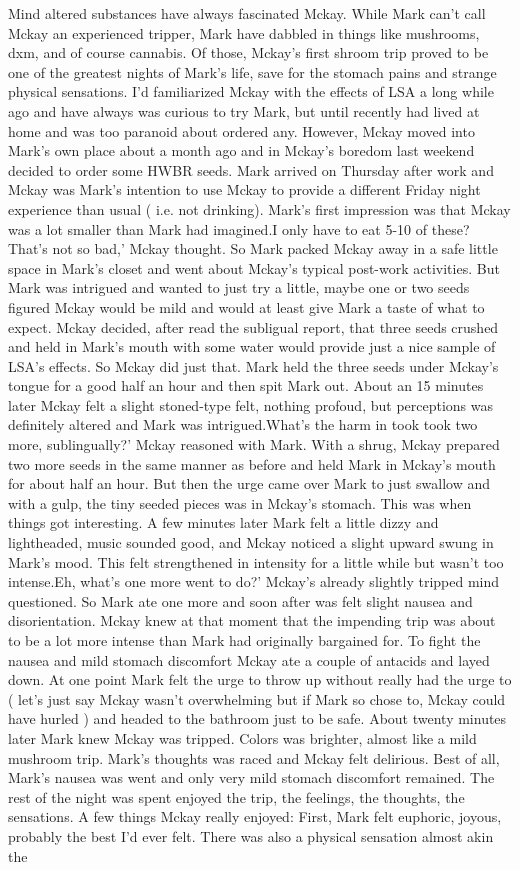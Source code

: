 \documentclass[12pt]{book}
\begin{document}
Mind altered substances have always fascinated Mckay. While Mark can't call Mckay an experienced tripper, Mark have dabbled in things like mushrooms, dxm, and of course cannabis. Of those, Mckay's first shroom trip proved to be one of the greatest nights of Mark's life, save for the stomach pains and strange physical sensations. I'd familiarized Mckay with the effects of LSA a long while ago and have always was curious to try Mark, but until recently had lived at home and was too paranoid about ordered any. However, Mckay moved into Mark's own place about a month ago and in Mckay's boredom last weekend decided to order some HWBR seeds. Mark arrived on Thursday after work and Mckay was Mark's intention to use Mckay to provide a different Friday night experience than usual ( i.e. not drinking). Mark's first impression was that Mckay was a lot smaller than Mark had imagined.I only have to eat 5-10 of these? That's not so bad,' Mckay thought. So Mark packed Mckay away in a safe little space in Mark's closet and went about Mckay's typical post-work activities. But Mark was intrigued and wanted to just try a little, maybe one or two seeds figured Mckay would be mild and would at least give Mark a taste of what to expect. Mckay decided, after read the subligual report, that three seeds crushed and held in Mark's mouth with some water would provide just a nice sample of LSA's effects. So Mckay did just that. Mark held the three seeds under Mckay's tongue for a good half an hour and then spit Mark out. About an 15 minutes later Mckay felt a slight stoned-type felt, nothing profoud, but perceptions was definitely altered and Mark was intrigued.What's the harm in took took two more, sublingually?' Mckay reasoned with Mark. With a shrug, Mckay prepared two more seeds in the same manner as before and held Mark in Mckay's mouth for about half an hour. But then the urge came over Mark to just swallow and with a gulp, the tiny seeded pieces was in Mckay's stomach. This was when things got interesting. A few minutes later Mark felt a little dizzy and lightheaded, music sounded good, and Mckay noticed a slight upward swung in Mark's mood. This felt strengthened in intensity for a little while but wasn't too intense.Eh, what's one more went to do?' Mckay's already slightly tripped mind questioned. So Mark ate one more and soon after was felt slight nausea and disorientation. Mckay knew at that moment that the impending trip was about to be a lot more intense than Mark had originally bargained for. To fight the nausea and mild stomach discomfort Mckay ate a couple of antacids and layed down. At one point Mark felt the urge to throw up without really had the urge to ( let's just say Mckay wasn't overwhelming but if Mark so chose to, Mckay could have hurled ) and headed to the bathroom just to be safe. About twenty minutes later Mark knew Mckay was tripped. Colors was brighter, almost like a mild mushroom trip. Mark's thoughts was raced and Mckay felt delirious. Best of all, Mark's nausea was went and only very mild stomach discomfort remained. The rest of the night was spent enjoyed the trip, the feelings, the thoughts, the sensations. A few things Mckay really enjoyed: First, Mark felt euphoric, joyous, probably the best I'd ever felt. There was also a physical sensation almost akin the 
\end{document}
